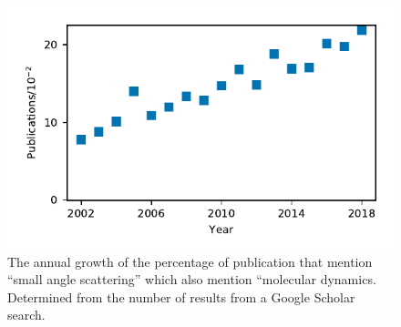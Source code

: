 \documentclass[pdf]{iucr}              %
\begin{document}

%
\begin{figure}
\caption{The annual growth of the percentage of publication that mention ``small angle scattering'' which also mention ``molecular dynamics. Determined from the number of results from a Google Scholar search.}
\label{fig:growth}
\includegraphics[width=\textwidth]{figures/chem_data_py.pdf}
\end{figure}
%
\end{document}

